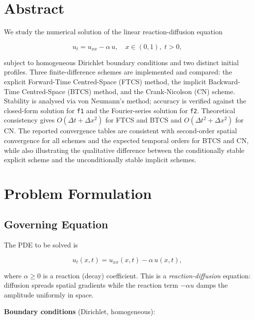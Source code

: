 \documentclass[11pt,a4paper]{article}
\begin{document}
\section*{Abstract}

We study the numerical solution of the linear reaction-diffusion equation

\begin{equation*}
u_t = u_{xx} - \alpha\, u, \quad x \in (0,1),\; t > 0,
\end{equation*}

subject to homogeneous Dirichlet boundary conditions and two distinct initial profiles. Three finite-difference schemes are implemented and compared: the explicit Forward-Time Centred-Space (FTCS) method, the implicit Backward-Time Centred-Space (BTCS) method, and the Crank-Nicolson (CN) scheme. Stability is analysed via von Neumann's method; accuracy is verified against the closed-form solution for \texttt{f1} and the Fourier-series solution for \texttt{f2}. Theoretical consistency gives $O(\Delta t + \Delta x^2)$ for FTCS and BTCS and $O(\Delta t^2 + \Delta x^2)$ for CN. The reported convergence tables are consistent with second-order spatial convergence for all schemes and the expected temporal orders for BTCS and CN, while also illustrating the qualitative difference between the conditionally stable explicit scheme and the unconditionally stable implicit schemes.

\section{Problem Formulation}

\subsection{Governing Equation}

The PDE to be solved is

\begin{equation}
u_t(x,t) = u_{xx}(x,t) - \alpha\, u(x,t), \tag{1}
\end{equation}

where $\alpha \geq 0$ is a reaction (decay) coefficient. This is a \emph{reaction-diffusion} equation: diffusion spreads spatial gradients while the reaction term $-\alpha u$ damps the amplitude uniformly in space.

\textbf{Boundary conditions} (Dirichlet, homogeneous):
\end{document}

